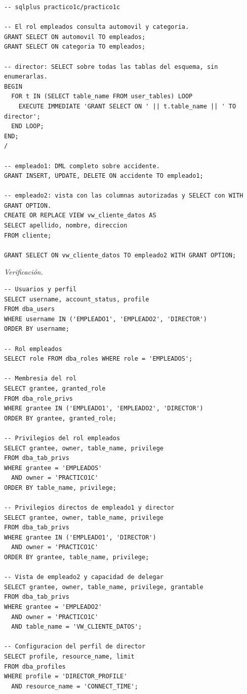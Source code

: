 \documentclass[11pt,a4paper]{article}
\begin{document}
\begin{lstlisting}
-- sqlplus practico1c/practico1c

-- El rol empleados consulta automovil y categoria.
GRANT SELECT ON automovil TO empleados;
GRANT SELECT ON categoria TO empleados;

-- director: SELECT sobre todas las tablas del esquema, sin enumerarlas.
BEGIN
  FOR t IN (SELECT table_name FROM user_tables) LOOP
    EXECUTE IMMEDIATE 'GRANT SELECT ON ' || t.table_name || ' TO director';
  END LOOP;
END;
/

-- empleado1: DML completo sobre accidente.
GRANT INSERT, UPDATE, DELETE ON accidente TO empleado1;

-- empleado2: vista con las columnas autorizadas y SELECT con WITH GRANT OPTION.
CREATE OR REPLACE VIEW vw_cliente_datos AS
SELECT apellido, nombre, direccion
FROM cliente;

GRANT SELECT ON vw_cliente_datos TO empleado2 WITH GRANT OPTION;
\end{lstlisting}

\textit{Verificación.}

\begin{lstlisting}
-- Usuarios y perfil
SELECT username, account_status, profile
FROM dba_users
WHERE username IN ('EMPLEADO1', 'EMPLEADO2', 'DIRECTOR')
ORDER BY username;

-- Rol empleados
SELECT role FROM dba_roles WHERE role = 'EMPLEADOS';

-- Membresia del rol
SELECT grantee, granted_role
FROM dba_role_privs
WHERE grantee IN ('EMPLEADO1', 'EMPLEADO2', 'DIRECTOR')
ORDER BY grantee, granted_role;

-- Privilegios del rol empleados
SELECT grantee, owner, table_name, privilege
FROM dba_tab_privs
WHERE grantee = 'EMPLEADOS'
  AND owner = 'PRACTICO1C'
ORDER BY table_name, privilege;

-- Privilegios directos de empleado1 y director
SELECT grantee, owner, table_name, privilege
FROM dba_tab_privs
WHERE grantee IN ('EMPLEADO1', 'DIRECTOR')
  AND owner = 'PRACTICO1C'
ORDER BY grantee, table_name, privilege;

-- Vista de empleado2 y capacidad de delegar
SELECT grantee, owner, table_name, privilege, grantable
FROM dba_tab_privs
WHERE grantee = 'EMPLEADO2'
  AND owner = 'PRACTICO1C'
  AND table_name = 'VW_CLIENTE_DATOS';

-- Configuracion del perfil de director
SELECT profile, resource_name, limit
FROM dba_profiles
WHERE profile = 'DIRECTOR_PROFILE'
  AND resource_name = 'CONNECT_TIME';
\end{lstlisting}
\end{document}
